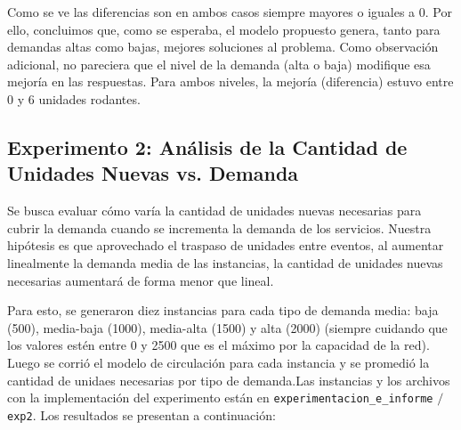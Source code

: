 \documentclass{article}
\begin{document}
Como se ve las diferencias son en ambos casos siempre mayores o iguales a 0. Por ello, concluimos que, como se esperaba, el modelo propuesto genera, tanto para demandas altas como bajas, mejores soluciones al problema. Como observación adicional, no pareciera que el nivel de la demanda (alta o baja) modifique esa mejoría en las respuestas. Para ambos niveles, la mejoría (diferencia) estuvo entre 0 y 6 unidades rodantes.

\subsection*{Experimento 2: Análisis de la Cantidad de Unidades Nuevas vs. Demanda}

Se busca evaluar cómo varía la cantidad de unidades nuevas necesarias para cubrir la demanda cuando se incrementa la demanda de los servicios. Nuestra hipótesis es que aprovechado el traspaso de unidades entre eventos, al aumentar linealmente la demanda media de las instancias, la cantidad de unidades nuevas necesarias aumentará de forma menor que lineal.

Para esto, se generaron diez instancias para cada tipo de demanda media: baja (500), media-baja (1000), media-alta (1500) y alta (2000) (siempre cuidando que los valores estén entre 0 y 2500 que es el máximo por la capacidad de la red). Luego se corrió el modelo de circulación para cada instancia y se promedió la cantidad de unidaes necesarias por tipo de demanda.Las instancias y los archivos con la implementación del experimento están en \texttt{experimentacion\_e\_informe} $/$ \texttt{exp2}.  Los resultados se presentan a continuación:
\end{document}
